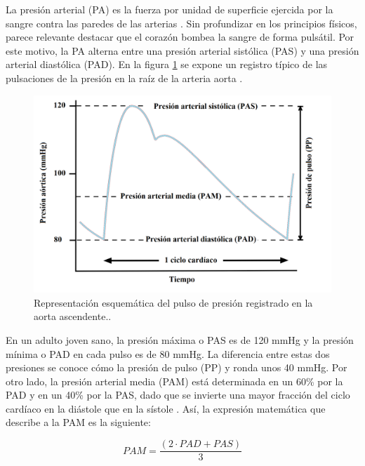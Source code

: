 La presión arterial (PA) es la fuerza por unidad de superficie ejercida por la sangre contra las paredes 
de las arterias \citep{CITE:1}. Sin profundizar en los principios físicos, parece relevante destacar que el corazón 
bombea la sangre de forma pulsátil. Por este motivo, la PA alterna entre una presión arterial sistólica (PAS) 
y una presión arterial diastólica (PAD). En la figura \ref{fig:aorticPulse} se expone un registro típico de las pulsaciones 
de la presión en la raíz de la arteria aorta \citep{CITE:2} \citep{CITE:3}. 

\begin{figure}[h!]
  \centering
  \includegraphics[width=\textwidth]{./Figures/aortic-pulse-pressure.png}
  \caption{Representación esquemática del pulso de presión registrado en la aorta ascendente.\protect\footnotemark.}\label{fig:aorticPulse}
\end{figure}


En un adulto joven sano, la presión máxima o PAS es de 
120 mmHg y la presión mínima o PAD en cada pulso es de 80 mmHg. La diferencia entre estas dos presiones 
se conoce cómo la presión de pulso (PP) y ronda unos 40 mmHg. Por otro lado, la presión arterial media (PAM) 
está determinada en un 60\% por la PAD y en un 40\% por la PAS, dado que se invierte una mayor fracción 
del ciclo cardíaco en la diástole que en la sístole \citep{CITE:2} \citep{CITE:3}. Así, la expresión matemática que describe 
a la PAM es la siguiente: 

\begin{equation}
	\label{eq:PAM}
	PAM = \frac{(2 \cdot PAD + PAS)}{3}
\end{equation}


